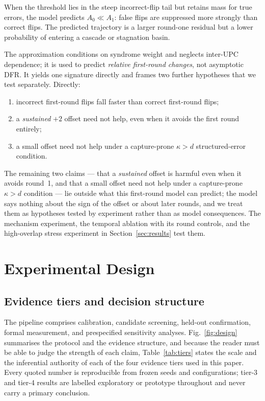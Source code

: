 \documentclass[lettersize,journal]{IEEEtran}
\begin{document}
When the threshold lies in the steep incorrect-flip tail but retains mass for true errors, the model predicts $A_0\ll A_1$: false flips are suppressed more strongly than correct flips. The predicted trajectory is a larger round-one residual but a lower probability of entering a cascade or stagnation basin.

The approximation conditions on syndrome weight and neglects inter-UPC dependence; it is used to predict \emph{relative first-round changes}, not asymptotic DFR. It yields one signature directly and frames two further hypotheses that we test separately. Directly:

\begin{enumerate}[label=(\roman*),leftmargin=1.7em,itemsep=0.1em,topsep=0.2em]
\item incorrect first-round flips fall faster than correct first-round flips;
\item a \emph{sustained} $+2$ offset need not help, even when it avoids the first round entirely;
\item a small offset need not help under a capture-prone $\kappa>d$ structured-error condition.
\end{enumerate}

The remaining two claims --- that a \emph{sustained} offset is harmful even when it avoids round~1, and that a small offset need not help under a capture-prone $\kappa>d$ condition --- lie outside what this first-round model can predict; the model says nothing about the sign of the offset or about later rounds, and we treat them as hypotheses tested by experiment rather than as model consequences. The mechanism experiment, the temporal ablation with its round controls, and the high-overlap stress experiment in Section~\ref{sec:results} test them.

\section{Experimental Design}\label{sec:method}

\subsection{Evidence tiers and decision structure}

The pipeline comprises calibration, candidate screening, held-out confirmation, formal measurement, and prespecified sensitivity analyses. Fig.~\ref{fig:design} summarises the protocol and the evidence structure, and because the reader must be able to judge the strength of each claim, Table~\ref{tab:tiers} states the scale and the inferential authority of each of the four evidence tiers used in this paper. Every quoted number is reproducible from frozen seeds and configurations; tier-3 and tier-4 results are labelled exploratory or prototype throughout and never carry a primary conclusion.
\end{document}
